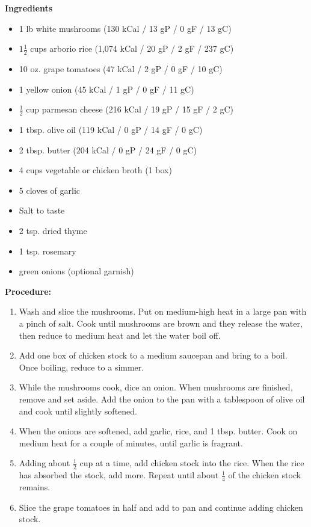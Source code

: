 \documentclass{report}
\begin{document}


\bigskip

\bigskip

\begin{multicols}{2}
\textbf{Ingredients}
\begin{itemize}
\item 1 lb white mushrooms \newline (130 kCal / 13 gP / 0 gF / 13 gC)
\item $1\frac{1}{2}$ cups arborio rice \quad (1,074 kCal / 20 gP / 2 gF / 237 gC)
\item 10 oz. grape tomatoes  \quad (47 kCal / 2 gP / 0 gF / 10 gC)
\item 1 yellow onion (45 kCal / 1 gP / 0 gF / 11 gC)
\item $\frac{1}{2}$ cup parmesan cheese \newline (216 kCal / 19 gP / 15 gF / 2 gC)
\item 1 tbsp. olive oil \newline (119 kCal / 0 gP / 14 gF / 0 gC)
\item 2 tbsp. butter \quad (204 kCal / 0 gP / 24 gF / 0 gC)
\item 4 cups vegetable or chicken broth (1 box)

\item 5 cloves of garlic
\item Salt to taste
\item $2$ tsp. dried thyme
\item 1 tsp. rosemary
\item green onions (optional garnish)




\end{itemize}


\columnbreak
\textbf{Procedure:}
\medskip


\begin{enumerate}

\item Wash and slice the mushrooms. Put on medium-high heat in a large pan with a pinch of salt. Cook until mushrooms are brown and they release the water, then reduce to medium heat and let the water boil off. 
\item Add one box of chicken stock to a medium saucepan and bring to a boil. Once boiling, reduce to a simmer. 
\item While the mushrooms cook, dice an onion. When mushrooms are finished, remove and set aside. Add the onion to the pan with a tablespoon of olive oil and cook until slightly softened. 
\item When the onions are softened, add garlic, rice, and 1 tbsp. butter. Cook on medium heat for a couple of minutes, until garlic is fragrant. 
\item Adding about $\frac{1}{2}$ cup at a time, add chicken stock into the rice. When the rice has absorbed the stock, add more. Repeat until about $\frac{1}{4}$ of the chicken stock remains. 
\item Slice the grape tomatoes in half and add to pan and continue adding chicken stock.


\end{enumerate}
\end{multicols}
\end{document}
